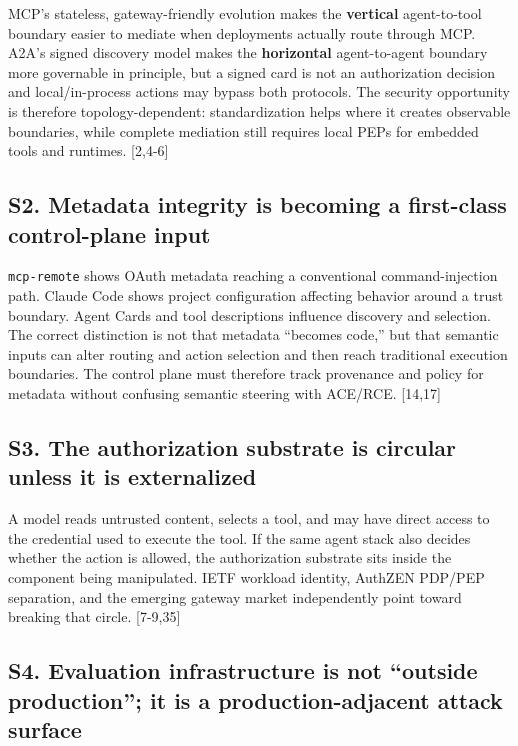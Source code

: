 \documentclass[
  10pt,
  letterpaper,
]{article}
\begin{document}
MCP's stateless, gateway-friendly evolution makes the \textbf{vertical}
agent-to-tool boundary easier to mediate when deployments actually route
through MCP. A2A's signed discovery model makes the \textbf{horizontal}
agent-to-agent boundary more governable in principle, but a signed card
is not an authorization decision and local/in-process actions may bypass
both protocols. The security opportunity is therefore
topology-dependent: standardization helps where it creates observable
boundaries, while complete mediation still requires local PEPs for
embedded tools and runtimes. {[}2,4-6{]}

\subsection{S2. Metadata integrity is becoming a first-class
control-plane
input}\label{s2.-metadata-integrity-is-becoming-a-first-class-control-plane-input}

\texttt{mcp-remote} shows OAuth metadata reaching a conventional
command-injection path. Claude Code shows project configuration
affecting behavior around a trust boundary. Agent Cards and tool
descriptions influence discovery and selection. The correct distinction
is not that metadata ``becomes code,'' but that semantic inputs can
alter routing and action selection and then reach traditional execution
boundaries. The control plane must therefore track provenance and policy
for metadata without confusing semantic steering with ACE/RCE.
{[}14,17{]}

\subsection{S3. The authorization substrate is circular unless it is
externalized}\label{s3.-the-authorization-substrate-is-circular-unless-it-is-externalized}

A model reads untrusted content, selects a tool, and may have direct
access to the credential used to execute the tool. If the same agent
stack also decides whether the action is allowed, the authorization
substrate sits inside the component being manipulated. IETF workload
identity, AuthZEN PDP/PEP separation, and the emerging gateway market
independently point toward breaking that circle. {[}7-9,35{]}

\subsection{S4. Evaluation infrastructure is not ``outside production'';
it is a production-adjacent attack
surface}\label{s4.-evaluation-infrastructure-is-not-outside-production-it-is-a-production-adjacent-attack-surface}
\end{document}
